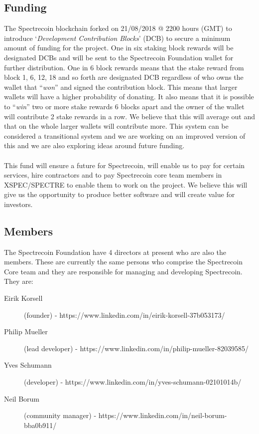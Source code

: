 \subsection{Funding}
The Spectrecoin blockchain forked on 21/08/2018 @ 2200 hours (GMT) to
introduce ‘\textit{Development Contribution Blocks}’ (DCB) to secure a
minimum amount of funding for the project. One in six staking block rewards
will be designated DCBs and will be sent to the Spectrecoin Foundation
wallet for further distribution. One in 6 block rewards means that the
stake reward from block 1, 6, 12, 18 and so forth are designated DCB
regardless of who owns the wallet that “\textit{won}” and signed the
contribution block. This means that larger wallets will have a higher
probability of donating. It also means that it is possible to
“\textit{win}” two or more stake rewards 6 blocks apart and the owner
of the wallet will contribute 2 stake rewards in a row. We believe that
this will average out and that on the whole larger wallets will contribute
more. This system can be considered a transitional system and we are working
on an improved version of this and we are also exploring ideas around
future funding.
\\
\\
\noindent
This fund will ensure a future for Spectrecoin, will enable us to pay for
certain services, hire contractors and to pay Spectrecoin core team members
in XSPEC/SPECTRE to enable them to work on the project. We believe this
will give us the opportunity to produce better software and will create
value for investors.



\subsection{Members}
The Spectrecoin Foundation have 4 directors at present who are also the members.
These are currently the same persons who comprise the Spectrecoin Core team
and they are responsible for managing and developing Spectrecoin.
They are:



\begin{description}
	\item[Eirik Korsell]  (founder) - https://www.linkedin.com/in/eirik-korsell-37b053173/
	\item[Philip Mueller] (lead developer) - https://www.linkedin.com/in/philip-mueller-82039585/
	\item[Yves Schumann] (developer) - https://www.linkedin.com/in/yves-schumann-02101014b/
	\item[Neil Borum] (community manager) - https://www.linkedin.com/in/neil-borum-bba0b911/
\end{description}



